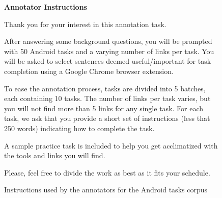 

\begin{figure}[!htb]
\begin{mdframed}[backgroundcolor=gray!04] 
\begin{footnotesize}

{\large \textbf{Annotator Instructions}} \bigskip


Thank you for your interest in this annotation task. \bigskip
 
After answering some background questions, you will be prompted with 50 Android tasks and a varying number of links per task. You will be asked to select sentences deemed useful/important for task completion using a Google Chrome browser extension.  \bigskip


To ease the annotation process,  tasks are divided into 5 batches, each containing 10 tasks. The number of links per task varies, but you will not find more than 5 links for any single task. For each task, we ask that you provide a short set of instructions (less that 250 words) indicating how to complete the task. \bigskip

A sample practice task is included to help you get acclimatized with the tools and links you will find. \bigskip


Please, feel free to divide the work as best as it fits your schedule.


\end{footnotesize}
\end{mdframed}
\caption{Instructions used by the annotators for the Android tasks corpus}
\end{figure}

\vfill
